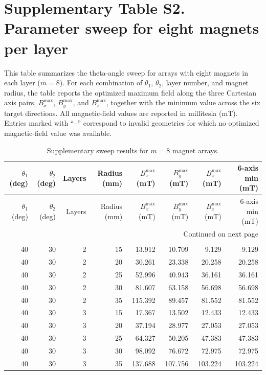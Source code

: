 \documentclass{article}
\begin{document}
\section*{Supplementary Table S2. Parameter sweep for eight magnets per layer}
\noindent
This table summarizes the theta-angle sweep for arrays with eight magnets in each layer
($m=8$). For each combination of $\theta_1$, $\theta_2$, layer number, and magnet
radius, the table reports the optimized maximum field along the three Cartesian
axis pairs, $B_x^{\max}$, $B_y^{\max}$, and $B_z^{\max}$, together with the
minimum value across the six target directions. All magnetic-field values are
reported in millitesla (mT). Entries marked with ``--'' correspond to invalid
geometries for which no optimized magnetic-field value was available.

\begin{longtable}{rrrrrrrr}
\caption{Supplementary sweep results for $m=8$ magnet arrays.}\\
\toprule
$\theta_1$ (deg) & $\theta_2$ (deg) & Layers & Radius (mm) & $B_x^{\max}$ (mT) & $B_y^{\max}$ (mT) & $B_z^{\max}$ (mT) & 6-axis min (mT) \\
\midrule
\endfirsthead
\toprule
$\theta_1$ (deg) & $\theta_2$ (deg) & Layers & Radius (mm) & $B_x^{\max}$ (mT) & $B_y^{\max}$ (mT) & $B_z^{\max}$ (mT) & 6-axis min (mT) \\
\midrule
\endhead
\midrule
\multicolumn{8}{r}{Continued on next page} \\
\endfoot
\bottomrule
\endlastfoot
\multicolumn{8}{l}{\textbf{$\theta_1=40^\circ$, $\theta_2=30^\circ$}} \\
40 & 30 & 2 & 15 & 13.912 & 10.709 & 9.129 & 9.129 \\
40 & 30 & 2 & 20 & 30.261 & 23.338 & 20.258 & 20.258 \\
40 & 30 & 2 & 25 & 52.996 & 40.943 & 36.161 & 36.161 \\
40 & 30 & 2 & 30 & 81.607 & 63.158 & 56.698 & 56.698 \\
40 & 30 & 2 & 35 & 115.392 & 89.457 & 81.552 & 81.552 \\
40 & 30 & 3 & 15 & 17.367 & 13.502 & 12.433 & 12.433 \\
40 & 30 & 3 & 20 & 37.194 & 28.977 & 27.053 & 27.053 \\
40 & 30 & 3 & 25 & 64.327 & 50.205 & 47.383 & 47.383 \\
40 & 30 & 3 & 30 & 98.092 & 76.672 & 72.975 & 72.975 \\
40 & 30 & 3 & 35 & 137.688 & 107.756 & 103.224 & 103.224 \\

\end{longtable}
\end{document}
